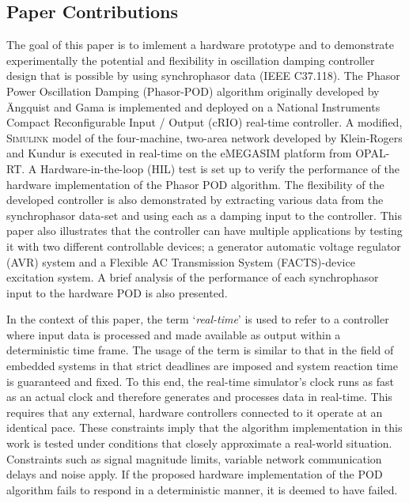 \documentclass[journal]{IEEEtran}
\begin{document}
\subsection{Paper Contributions}
The goal of this paper is to imlement a hardware prototype and to demonstrate experimentally the potential and flexibility in oscillation damping controller design that is possible by using synchrophasor data (IEEE C37.118). The Phasor Power Oscillation Damping (Phasor-POD) algorithm originally developed by \"{A}ngquist and Gama\cite{PhasorPOD} is implemented and deployed on a National Instruments Compact Reconfigurable Input / Output (cRIO) real-time controller. A modified, \textsc{Simulink} model of the four-machine, two-area network developed by Klein-Rogers and Kundur \cite{KundurTwoArea} is executed in real-time on the eMEGASIM \cite{eMEGASIM} platform from OPAL-RT. A Hardware-in-the-loop (HIL) test is set up to verify the performance of the hardware implementation of the Phasor POD algorithm. The flexibility of the developed controller is also demonstrated by extracting various data from the synchrophasor data-set and using each as a damping input to the controller. This paper also illustrates that the controller can have multiple applications by testing it with two different controllable devices; a generator automatic voltage regulator (AVR) system and a Flexible AC Transmission System (FACTS)-device excitation system. A brief analysis of the performance of each synchrophasor input to the hardware POD is also presented.\\\vspace{-1em}

In the context of this paper, the term `\emph{real-time}' is used to refer to a controller where input data is processed and made available as output within a deterministic time frame. The usage of the term is similar to that in the field of embedded systems in that strict deadlines are imposed and system reaction time is guaranteed and fixed. To this end, the real-time simulator's clock runs as fast as an actual clock and therefore generates and processes data in real-time. This requires that any external, hardware controllers connected to it operate at an identical pace. These constraints imply that the algorithm implementation in this work is tested under conditions that closely approximate a real-world situation. Constraints such as signal magnitude limits, variable network communication delays and noise apply. If the proposed hardware implementation of the POD algorithm fails to respond in a deterministic manner, it is deemed to have failed.\\\vspace{-1em}
\end{document}
